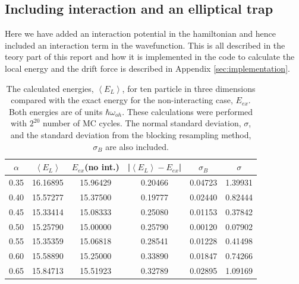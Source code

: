 \subsection{Including interaction and an elliptical trap}

Here we have added an interaction potential in the hamiltonian and hence included an interaction term in the wavefunction. This is all described in the teory part of this report and how it is implemented in the code to calculate the local energy and the drift force is described in Appendix \ref{sec:implementation}.

\begin{table}[H]\caption{The calculated energies, $\left<E_L\right>$, for ten particle in three dimensions compared with the exact energy for the non-interacting case, $E_{ex}$. Both energies are of units $\hbar\omega_{oh}$. These calculations were performed with $2^{20}$ number of MC cycles. The normal standard deviation, $\sigma$, and the standard deviation from the blocking resampling method, $\sigma_B$ are also included.}\label{tab:interaction_N_10}
\center
\begin{tabular}{cccccc}
$\alpha$ & $\left< E_L \right>$ & $E_{ex}$(no int.) & |$\left< E_L \right>-E_{ex}$|  & $\sigma_B$ & $\sigma$\\ \hline
0.35 & 16.16895 & 15.96429 & 0.20466 & 0.04723 & 1.39931\\
0.40 & 15.57277 & 15.37500 & 0.19777 & 0.02440 & 0.82444\\
0.45 & 15.33414 & 15.08333 & 0.25080 & 0.01153 & 0.37842\\
0.50 & 15.25790 & 15.00000 & 0.25790 & 0.00120 & 0.07902\\
0.55 & 15.35359 & 15.06818 & 0.28541 & 0.01228 & 0.41498\\
0.60 & 15.58890 & 15.25000 & 0.33890 & 0.01847 & 0.74266\\
0.65 & 15.84713 & 15.51923 & 0.32789 & 0.02895 & 1.09169\\
\end{tabular}
\end{table} 

